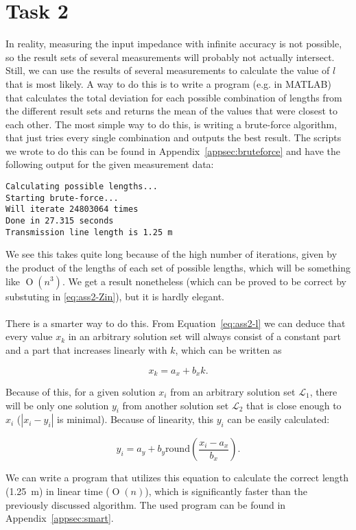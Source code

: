 \documentclass[11pt,titlepage]{report}
\begin{document}
\section{Task 2}
In reality, measuring the input impedance with infinite accuracy is not possible, so the result sets of several measurements will probably not actually intersect.
\\
Still, we can use the results of several measurements to calculate the value of $l$ that is most likely. A way to do this is to write a program (e.g. in MATLAB) that calculates the total deviation for each possible combination of lengths from the different result sets and returns the mean of the values that were closest to each other. The most simple way to do this, is writing a brute-force algorithm, that just tries every single combination and outputs the best result. The scripts we wrote to do this can be found in Appendix~\ref{appsec:bruteforce} and have the following output for the given measurement data:

\begin{verbatim}
Calculating possible lengths...
Starting brute-force...
Will iterate 24803064 times
Done in 27.315 seconds
Transmission line length is 1.25 m
\end{verbatim}

We see this takes quite long because of the high number of iterations, given by the product of the lengths of each set of possible lengths, which will be something like $\operatorname{O}(n^3)$. We get a result nonetheless (which can be proved to be correct by substuting in \ref{eq:ass2-Zin}), but it is hardly elegant.
\\
\\
There is a smarter way to do this. From Equation~\ref{eq:ass2-l} we can deduce that every value $x_k$ in an arbitrary solution set will always consist of a constant part and a part that increases linearly with $k$, which can be written as

\begin{equation}
	x_k = a_x + b_x k.
\end{equation}

Because of this, for a given solution $x_i$ from an arbitrary solution set $\mathcal{L_1}$, there will be only one solution $y_i$ from another solution set $\mathcal{L_2}$ that is close enough to $x_i$ ($|x_i-y_i|$ is minimal). Because of linearity, this $y_i$ can be easily calculated:

\begin{equation}
	y_i = a_y + b_y \mathrm{round}\left(\frac{x_i-a_x}{b_x}\right).
\end{equation}

We can write a program that utilizes this equation to calculate the correct length (\SI{1.25}{m}) in linear time ($\operatorname{O}(n)$), which is significantly faster than the previously discussed algorithm. The used program can be found in Appendix~\ref{appsec:smart}.
	
\end{document}
